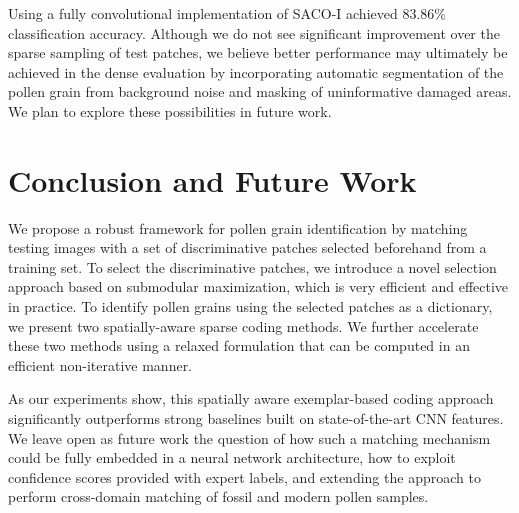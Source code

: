 \documentclass[10pt,twocolumn,letterpaper]{article}
\begin{document}
Using a fully convolutional implementation of SACO-I achieved $83.86\%$
classification accuracy.  Although we do not see significant
improvement over the sparse sampling of test patches, we believe better
performance may ultimately be achieved in the dense evaluation by incorporating
automatic segmentation of the pollen grain from background noise and masking of
uninformative damaged areas.  We plan to explore these possibilities in
future work.

\section{Conclusion and Future Work}
We propose a robust framework for pollen grain identification by matching
testing images with a set of discriminative patches selected beforehand from a
training set.  To select the discriminative patches, we introduce a novel
selection approach based on submodular maximization, which is very efficient
and effective  in practice.  To identify pollen grains using the selected
patches as a dictionary, we present two spatially-aware sparse coding methods.
We further accelerate these two methods using a relaxed formulation that
can be computed in an efficient non-iterative manner.

As our experiments show, this spatially aware exemplar-based coding approach
significantly outperforms strong baselines built on state-of-the-art CNN
features.  We leave open as future work the question of how such a matching
mechanism could be fully embedded in a neural network architecture,
how to exploit confidence scores provided with expert labels, and extending the
approach to perform cross-domain matching of fossil and modern pollen samples.







{\small


}
\end{document}
